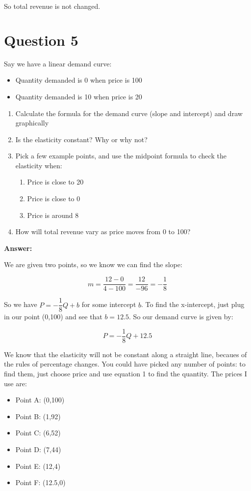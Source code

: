 \documentclass[12pt]{article}
\begin{document}
So total revenue is not changed.

\vspace{2mm}

\section*{Question 5}
Say we have a linear demand curve:
\begin{itemize}
    \item Quantity demanded is 0 when price is 100
    \item Quantity demanded is 10 when price is 20
\end{itemize}

\medskip

\begin{enumerate}
    \item Calculate the formula for the demand curve (slope and intercept) and draw graphically
    \item Is the elasticity constant? Why or why not?
    \item Pick a few example points, and use the midpoint formula to check the elasticity when:
        \begin{enumerate}
            \item Price is close to 20
            \item Price is close to 0
            \item Price is around 8
        \end{enumerate}
    \item How will total revenue vary as price moves from 0 to 100?
\end{enumerate}

\textbf{Answer:}

We are given two points, so we know we can find the slope:

$$ m = \dfrac{12-0}{4-100} = \dfrac{12}{-96} = -\dfrac{1}{8} $$

So we have $P = -\dfrac{1}{8}Q + b$ for some intercept $b$. To find the x-intercept, just plug in our point (0,100) and see that $b = 12.5$. So our demand curve is given by:

\begin{equation}
    \label{eq:demand}
    P = -\dfrac{1}{8} Q + 12.5
\end{equation}

We know that the elasticity will not be constant along a straight line, becaues of the rules of percentage changes. You could have picked any number of points: to find them, just choose price and use equation 1 to find the quantity. The prices I use are:
\begin{itemize}
    \item Point A: (0,100)
    \item Point B: (1,92)
    \item Point C: (6,52)
    \item Point D: (7,44)
    \item Point E: (12,4)
    \item Point F: (12.5,0)
\end{itemize}
\end{document}
